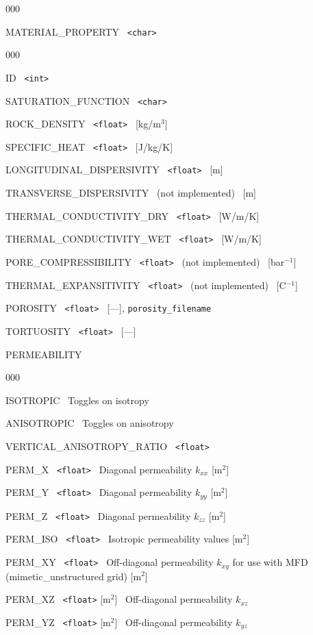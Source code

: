 \documentclass[12pt]{article}
\begin{document}
\begin{deflist}{000}
\item[MATERIAL\_PROPERTY] \ {\tt <char>}
\begin{deflist}{000}
\item[ID] \ {\tt <int>}
\item[SATURATION\_FUNCTION] \ {\tt <char>}
\item[ROCK\_DENSITY] \ {\tt <float>} \ [kg/m$^3$]
\item[SPECIFIC\_HEAT] \ {\tt <float>} \ [J/kg/K]
\item[LONGITUDINAL\_DISPERSIVITY] \ {\tt <float>} \ [m]
\item[TRANSVERSE\_DISPERSIVITY] \ (not implemented) \ [m]
\item[THERMAL\_CONDUCTIVITY\_DRY] \ {\tt <float>} \ [W/m/K]
\item[THERMAL\_CONDUCTIVITY\_WET] \ {\tt <float>} \ [W/m/K]
\item[PORE\_COMPRESSIBILITY] \ {\tt <float>} \ (not implemented) \ [bar$^{-1}$]
\item[THERMAL\_EXPANSITIVITY] \ {\tt <float>} \ (not implemented) \ [C$^{-1}$]
\item[POROSITY] \ {\tt <float>} \ [---], {\tt porosity\_filename}
\item[TORTUOSITY] \ {\tt <float>} \ [---]
\item[PERMEABILITY] ~
\begin{deflist}{000}
\item[ISOTROPIC] \ Toggles on isotropy
\item[ANISOTROPIC] \ Toggles on anisotropy
\item[VERTICAL\_ANISOTROPY\_RATIO] \ {\tt <float>}
\item[PERM\_X] \ {\tt <float>} \ Diagonal permeability $k_{xx}$ [m$^2$]
\item[PERM\_Y] \ {\tt <float>} \ Diagonal permeability $k_{yy}$ [m$^2$]
\item[PERM\_Z] \ {\tt <float>} \ Diagonal permeability $k_{zz}$ [m$^2$]
\item[PERM\_ISO] \ {\tt <float>} \ Isotropic permeability values [m$^2$]
\item[PERM\_XY] \ {\tt <float>} \ Off-diagonal permeability $k_{xy}$ for use with MFD (mimetic\_unstructured grid) [m$^2$]
\item[PERM\_XZ] \ {\tt <float>} [m$^2$] \ Off-diagonal permeability $k_{xz}$
\item[PERM\_YZ] \ {\tt <float>} [m$^2$] \ Off-diagonal permeability $k_{yz}$

\end{deflist}
\end{deflist}
\end{deflist}
\end{document}
